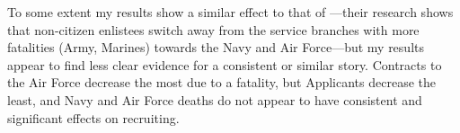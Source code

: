\documentclass[12pt] {article}
\begin{document}
To some extent my results show a similar effect to that of \cite{cunha2014expedited}---their research shows that non-citizen enlistees switch away from the service branches with more fatalities (Army, Marines) towards the Navy and Air Force---but my results appear to find less clear evidence for a consistent or similar story. Contracts to the Air Force decrease the most due to a fatality, but Applicants decrease the least, and Navy and Air Force deaths do not appear to have consistent and significant effects on recruiting.
  



%




\end{document}
